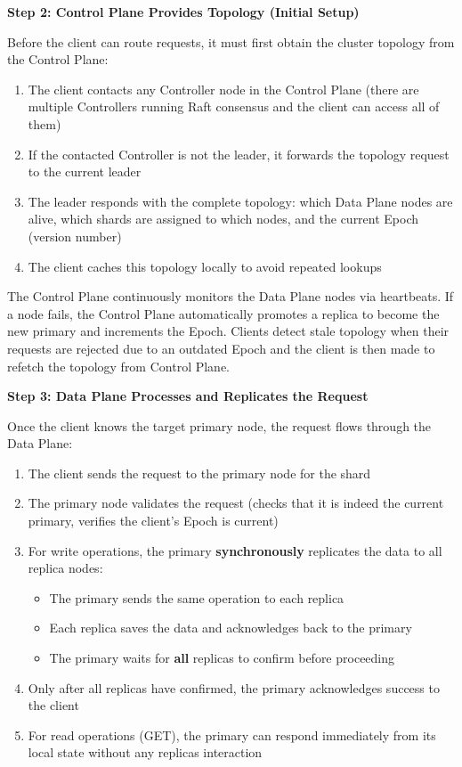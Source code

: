 \documentclass[shortabstract]{iithesis}
\begin{document}
\textbf{Step 2: Control Plane Provides Topology (Initial Setup)}

Before the client can route requests, it must first obtain the cluster topology from the Control Plane:
\begin{enumerate}
    \item The client contacts any Controller node in the Control Plane (there are multiple Controllers running Raft consensus and the client can access all of them)
    \item If the contacted Controller is not the leader, it forwards the topology request to the current leader
    \item The leader responds with the complete topology: which Data Plane nodes are alive, which shards are assigned to which nodes, and the current Epoch (version number)
    \item The client caches this topology locally to avoid repeated lookups
\end{enumerate}

The Control Plane continuously monitors the Data Plane nodes via heartbeats. If a node fails, the Control Plane automatically promotes a replica to become the new primary and increments the Epoch. Clients detect stale topology when their requests are rejected due to an outdated Epoch and the client is then made to refetch the topology from Control Plane.

\textbf{Step 3: Data Plane Processes and Replicates the Request}

Once the client knows the target primary node, the request flows through the Data Plane:
\begin{enumerate}
    \item The client sends the request to the primary node for the shard
    \item The primary node validates the request (checks that it is indeed the current primary, verifies the client's Epoch is current)
    \item For write operations, the primary \textbf{synchronously} replicates the data to all replica nodes:
    \begin{itemize}
        \item The primary sends the same operation to each replica
        \item Each replica saves the data and acknowledges back to the primary
        \item The primary waits for \textbf{all} replicas to confirm before proceeding
    \end{itemize}
    \item Only after all replicas have confirmed, the primary acknowledges success to the client
    \item For read operations (GET), the primary can respond immediately from its local state without any replicas interaction
\end{enumerate}
\end{document}

